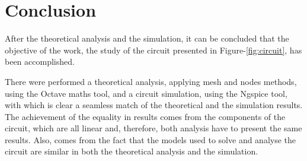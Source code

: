\section{Conclusion}
\label{sec:conclusion}

After the theoretical analysis and the simulation, it can be concluded that the
objective of the work, the study of the circuit presented in Figure-\ref{fig:circuit},
has been accomplished. \par
There were performed a theoretical analysis, applying mesh and nodes methods,
using the Octave maths tool, and a circuit simulation, using the Ngspice tool, with which is clear a seamless match of the theoretical and the simulation results. The achievement of the equality in results comes from the components of the circuit, which are all linear and, therefore, both analysis have to present the same results. Also, comes from the fact that the models used to solve and analyse the circuit are similar in both the theoretical analysis and the simulation.
